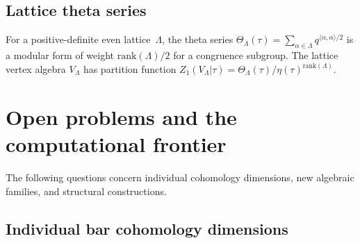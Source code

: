 \subsection{Lattice theta series}

For a positive-definite even lattice~$\Lambda$, the theta series $\Theta_\Lambda(\tau) = \sum_{\alpha \in \Lambda} q^{\langle\alpha,\alpha\rangle/2}$ is a modular form of weight $\mathrm{rank}(\Lambda)/2$ for a congruence subgroup.  The lattice vertex algebra $V_\Lambda$ has partition function $Z_1(V_\Lambda | \tau) = \Theta_\Lambda(\tau) / \eta(\tau)^{\mathrm{rank}(\Lambda)}$.


\section{Open problems and the computational frontier}
\label{sec:open-problems}

The following questions concern individual cohomology dimensions, new algebraic families, and structural constructions.

\subsection{Individual bar cohomology dimensions}

